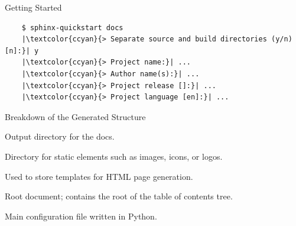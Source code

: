 {
\begin{frame}[fragile]{Getting Started}
  \begin{verbatim}
    $ sphinx-quickstart docs
    |\textcolor{ccyan}{> Separate source and build directories (y/n) [n]:}| y
    |\textcolor{ccyan}{> Project name:}| ...
    |\textcolor{ccyan}{> Author name(s):}| ...
    |\textcolor{ccyan}{> Project release []:}| ...
    |\textcolor{ccyan}{> Project language [en]:}| ...
  \end{verbatim}

  \begin{center}
  \pause
  \begin{minipage}{.45\textwidth}
  \end{minipage}
  \hfill
  \pause
  \begin{minipage}{.45\textwidth}
  \end{minipage}
  \end{center}
\end{frame}
}

{
\begin{frame}[fragile]{Breakdown of the Generated Structure}
  \begin{description}[labelwidth=\widthof{\faFolderOpen \texttt{\_templates}}]
    \setlength{\itemindent}{-4em}
    \item [\textcolor{dircolor}{\faFolderOpen} \texttt{build}:] Output directory for the docs.
    \item [\textcolor{dircolor}{\faFolderOpen} \texttt{\_static}:] Directory for static elements such as images, icons, or logos.
    \item [\textcolor{dircolor}{\faFolderOpen} \texttt{\_templates}:] Used to store 
      templates for HTML page generation. %
    \item [\faFile* \texttt{index.rst}:] Root document; contains the root of the table of contents tree.
    \item [\faPython \texttt{conf.py}:] Main configuration file written in Python.
  \end{description}
\end{frame}
}


